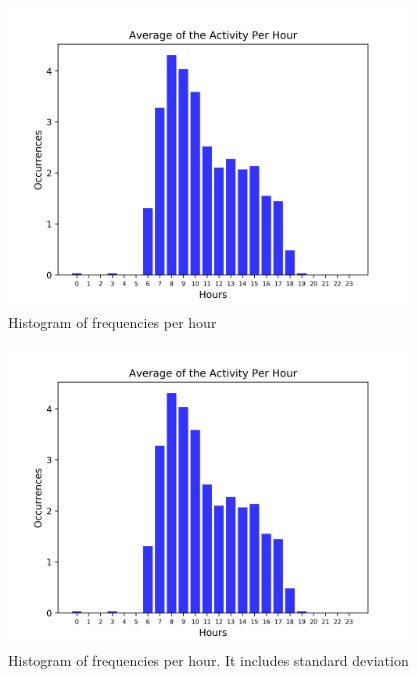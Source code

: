 \documentclass[11pt,fleqn]{book} %
\begin{document}
\begin{figure}[h!]%
\centering%
\includegraphics[width=400px]{Pictures/plots/good/Morelia Hive 1histogramClean.png}%
\caption{Histogram of frequencies per hour}%
\end{figure}

%


\begin{figure}[h!]%
\centering%
\includegraphics[width=400px]{Pictures/plots/good/Morelia Hive 1histogramClean.png}%
\caption{Histogram of frequencies per hour. It includes standard deviation}%
\end{figure}
\end{document}
